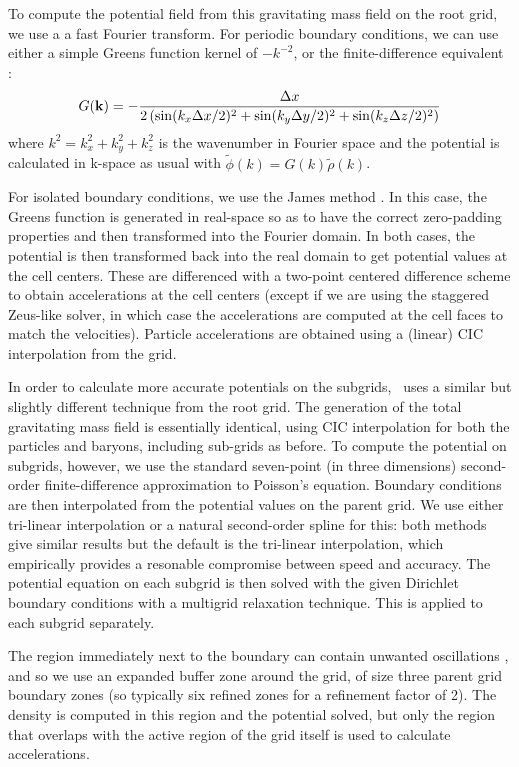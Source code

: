 To compute the potential field from this gravitating mass field on the root grid, we use a a fast Fourier transform. For periodic boundary conditions, we can use either a simple Greens function kernel of $-k^{-2}$, or the finite-difference equivalent \citep{Hockney88}:
\begin{equation}
G(\myvec{k}) = - \frac{\Delta x}{2 \left( \sin(k_x \Delta x/2)^2 + \sin(k_y \Delta y/2)^2 + \sin(k_z \Delta z/2)^2 \right) }
\end{equation}
where $k^2 = k_x^2 + k_y^2 + k_z^2$ is the wavenumber in Fourier space and the potential is calculated in k-space as usual with $\tilde{\phi}(k) = G(k) \tilde{\rho}(k)$.  

For isolated boundary conditions, we use the James method \citep{James77}.  In this case, the Greens function is generated in real-space so as to have the correct zero-padding properties and then transformed into the Fourier domain.  In both cases, the potential is then transformed back into the real domain to get potential values at the cell centers.  These are differenced with a two-point centered difference scheme to obtain accelerations at the cell centers (except if we are using the staggered Zeus-like solver, in which case the accelerations are computed at the cell faces to match the velocities).  Particle accelerations are obtained using a (linear) CIC interpolation from the grid.

In order to calculate more accurate potentials on the subgrids, \enzo\ uses a similar but slightly different technique from the root grid.  The generation of the total gravitating mass field is essentially identical, using CIC interpolation for both the particles and baryons, including sub-grids as before.  To compute the potential on subgrids, however, we use the standard seven-point (in three dimensions) second-order finite-difference approximation to Poisson's equation.  Boundary conditions are then interpolated from the potential values on the parent grid.  We use either tri-linear interpolation or a natural second-order spline for this: both methods give similar results but the default is the tri-linear interpolation, which empirically provides a resonable compromise between speed and accuracy. The potential equation on each subgrid is then solved with the given Dirichlet boundary conditions with a multigrid relaxation technique.  This is applied to each subgrid separately.

The region immediately next to the boundary can contain unwanted oscillations \citep[e.g.,][]{Anninos94}, and so we use an expanded buffer zone around the grid, of size three parent grid boundary zones (so typically six refined zones for a refinement factor of 2).  The density is computed in this region and the potential solved, but only the region that overlaps with the active region of the grid itself is used to calculate accelerations.

